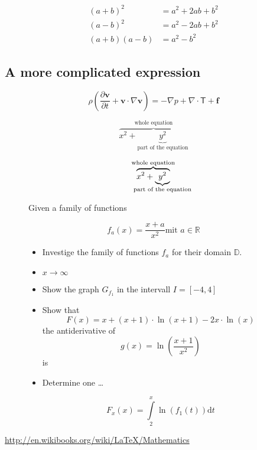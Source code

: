 \documentclass[10pt, a4paper]{article}
\numberwithin{equation}{section}
\numberwithin{figure}{section}
\begin{document}
\begin{align}
  (a+b)^2    &=    a^2+2ab+b^2 \nonumber \\
  (a-b)^2    &=    a^2-2ab+b^2 \nonumber \\
  (a+b)(a-b) &=    a^2-b^2
\end{align}

\subsection{A more complicated expression}
\[ \rho\left( \frac{\partial \mathbf{v}}{\partial t} + \mathbf{v}\cdot\nabla\mathbf{v}\right) = -\nabla p + \nabla\cdot\mathsf{T}+\mathbf{f} \]

\[ \overbrace{x^2 + \underbrace{y^2}_\text{part of the equation}}^\text{whole equation} \]

\[ \overbrace{x^2 + \underbrace{y^2}_{\mathclap{\text{part of the equation}}}}^{{\text{whole equation}}} \]

\begin{figure}[h!]
Given a family of functions

\[ f_a(x) = \frac{x+a}{x^2} \text{mit } a \in \mathbb{R} \]

\begin{itemize}
\item Investige the family of functions \( f_a \) for their domain \( \mathbb{D} \).
\item \( x \to \infty \)
\item Show the graph \( G_{f_1} \) in the intervall \( I = [-4,4] \)
\item Show that 
\[ F(x) = x+ (x+1)\cdot\ln(x+1)-2x\cdot\ln(x) \]
the antiderivative of \[ g(x) = \ln\left(\dfrac{x+1}{x^2}\right) \] is
\item Determine one \ldots

\[ F_x(x) = \int\limits_2^x\ln\left(f_1(t)\right)\mathrm{d}t \]

\end{itemize}
\end{figure}

\url{http://en.wikibooks.org/wiki/LaTeX/Mathematics}
\end{document}
